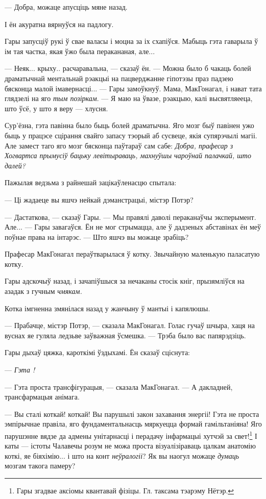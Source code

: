 --- Добра, можаце апусціць мяне назад.

І ён акуратна вярнуўся на падлогу.

Гары запусціў рукі ў свае валасы і моцна за іх схапіўся. Мабыць гэта гаварыла ў ім тая частка,
якая ўжо была перакананая, але...

--- Неяк... крыху.. расчаравальна, --- сказаў ён. --- Можна было б чакаць болей драматычнай
ментальнай рэакцыі на пацверджанне гіпотэзы праз падзею бясконца малой імавернасці... --- Гары
замоўкнуў. Мама, МакГонагал, і нават тата глядзелі на яго \emph{тым позіркам}. --- Я маю на ўвазе,
рэакцыю, калі высвятляееца, што ўсё, у што я веру --- хлусня.

Сур'ёзна, гэта павінна было быць болей драматычна. Яго мозг быў павінен ужо быць у працэсе
сцірання свайго запасу тэорый аб сусвеце, якія супярэчылі магіі. Але замест таго яго мозг
бясконца паўтараў сам сабе: \emph{Добра, прафесар з Хогвартса прымусіў бацьку левітыраваць,
махнуўшы чароўнай палачкай, што далей?}

Пажылая ведзьма з райнешай зацікаўленасцю спытала:

--- Ці жадаеце вы яшчэ нейкай дэманстрацыі, містэр Потэр?

--- Дастаткова, --- сказаў Гары. --- Мы правялі даволі пераканаўчы эксперымент. Але... --- Гары
завагаўся. Ён не мог стрымацца, але ў дадзеных абставінах ён меў поўнае права на інтарэс. --- Што
яшчэ вы можаце зрабіць?

Прафесар МакГонагал пераўтварылася ў котку. Звычайную маленькую паласатую котку.

Гары адскочыў назад, і зачапіўшыся за нечаканы стосік кніг, прызямліўся на азадак з гучным
\emph{чмякам.} 

Котка імгненна змянілася назад у жанчыну ў мантыі і капялюшы. 

--- Прабачце, містэр Потэр, --- сказала МакГонагал. Голас гучаў шчыра, хаця на вуснах яе гуляла 
ледзьве заўважная ўсмешка. --- Трэба было вас папярэдзіць.

Гары дыхаў цяжка, кароткімі ўздыхамі. Ён сказаў сціснута:

--- \emph{Гэта !}

--- Гэта проста трансфігурацыя, --- сказала МакГонагал. --- А дакладней, трансфармацыя анімага.

--- Вы сталі коткай!  коткай! Вы парушылі закон захавання энергіі! Гэта не 
проста эмпірычнае правіла, яго фундаментальнасць мяркуецца формай гамільтаніяна!
Яго парушэнне вядзе да адмены унітарнасці і перадачу інфармацыі хутчэй за свет!\footnote{
{}Гары згадвае аксіомы квантавай фізіцы. Гл. таксама тэарэму Нётэр.
} І каты ---
істоты  Чалавечы розум не можа проста візуалізіраваць цалкам анатомію коткі, яе 
біяхімію... і што на конт \emph{неўралогіі}? Як вы наогул можаце \emph{думаць} мозгам такога
памеру?


